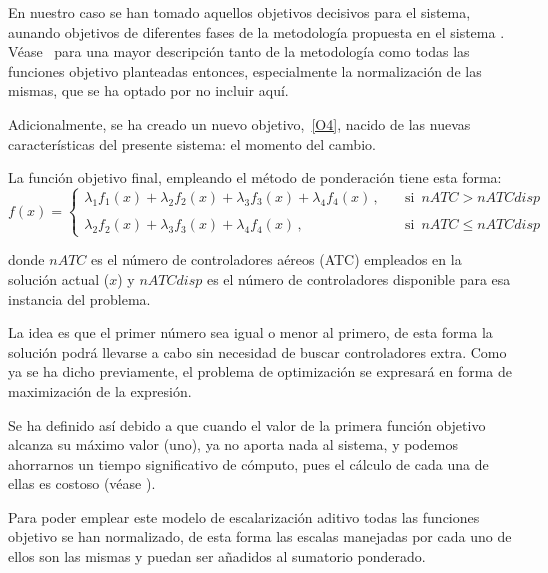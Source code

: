 En nuestro caso se han tomado aquellos objetivos decisivos para el sistema, aunando objetivos de diferentes fases de la metodología propuesta en el sistema \legacy{}. Véase~\cite{articulo1} para una mayor descripción tanto de la metodología \legacy{} como todas las funciones objetivo planteadas entonces, especialmente la normalización de las mismas, que se ha optado por no incluir aquí.

Adicionalmente, se ha creado un nuevo objetivo,~\ref{O4}, nacido de las nuevas características del presente sistema: el momento del cambio.


La función objetivo final, empleando el método de ponderación tiene esta forma:
\[
    f(x)=
    \begin{cases}
        \lambda_1 f_1(x) + \lambda_2 f_2(x) + \lambda_3 f_3(x) + \lambda_4 f_4(x)\,, & \quad \textrm{si } \, nATC > nATCdisp  \\
        \\
        \lambda_2 f_2(x) + \lambda_3 f_3(x) + \lambda_4 f_4(x)\,,                    & \quad \textrm{si } \,  nATC \le nATCdisp
    \end{cases}
\]

donde $nATC$ es el número de controladores aéreos (ATC) empleados en la solución actual ($x$) y $nATCdisp$ es el número de controladores disponible para esa instancia del problema. 

La idea es que el primer número sea igual o menor al primero, de esta forma la solución podrá llevarse a cabo sin necesidad de buscar controladores extra. Como ya se ha dicho previamente, el problema de optimización se expresará en forma de maximización de la expresión.

Se ha definido así debido a que cuando el valor de la primera función objetivo alcanza su máximo valor (uno), ya no aporta nada al sistema, y podemos ahorrarnos un tiempo significativo de cómputo, pues el cálculo de cada una de ellas es costoso (véase ).%

Para poder emplear este modelo de escalarización aditivo todas las funciones objetivo se han normalizado, de esta forma las escalas manejadas por cada uno de ellos son las mismas y puedan ser añadidos al sumatorio ponderado.

